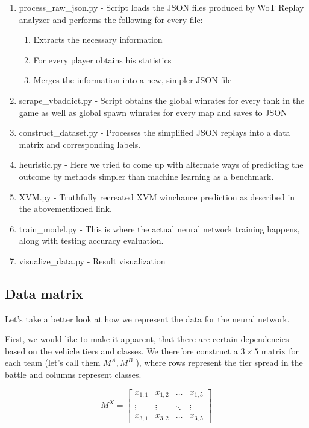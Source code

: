 \documentclass{report}
\begin{document}
\begin{enumerate}
	\item{
		process\_raw\_json.py - Script loads the JSON files produced by WoT Replay analyzer and performs the following for every file:
		\begin{enumerate}
			\item{Extracts the necessary information}
			\item{For every player obtains his statistics}
			\item{Merges the information into a new, simpler JSON file}
		\end{enumerate}
		}
	\item{
		scrape\_vbaddict.py - Script obtains the global winrates for every tank in the game as well as global spawn winrates for every map and saves to JSON
	}
	\item{
		construct\_dataset.py - Processes the simplified JSON replays into a data matrix and corresponding labels.
	}
	\item{
		heuristic.py - Here we tried to come up with alternate ways of predicting the outcome by methods simpler than machine learning as a benchmark.
	}
	\item{
		XVM.py - Truthfully recreated XVM winchance prediction as described in the abovementioned link.
	}
	\item{
		train\_model.py - This is where the actual neural network training happens, along with testing accuracy evaluation.
	}
	\item{
		visualize\_data.py - Result visualization
	}
\end{enumerate}

\subsection{Data matrix}

Let's take a better look at how we represent the data for the neural network.

First, we would like to make it apparent, that there are certain dependencies 
based on the vehicle tiers and classes. We therefore construct a $3 \times 5$ matrix for each team (let's call them $M^A, M^B$ ), 
where rows represent the tier spread in the battle and columns represent classes.

\[
M^X = 
\begin{bmatrix}
    x_{1,1} & x_{1,2}  & \dots  & x_{1,5} \\ \\
    \vdots & \vdots  & \ddots & \vdots \\
    x_{3,1} & x_{3,2}  & \dots  & x_{3,5}
\end{bmatrix}
\]
\end{document}
